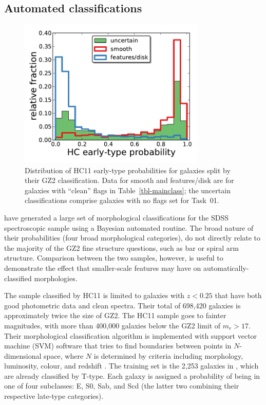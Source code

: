 \documentclass[useAMS,usenatbib]{mn2e}
\begin{document}
\subsection{Automated classifications}

\begin{figure}
\includegraphics[angle=0,width=3.5in]{figures/hc_histogram.pdf}
\caption{Distribution of HC11 early-type probabilities for galaxies split by their GZ2 classification. Data for smooth and features/disk are for galaxies with ``clean'' flags in Table~\ref{tbl-mainclass}; the uncertain classifications comprise galaxies with no flags set for Task~01. 
\label{fig-hc_histogram}}
\end{figure}

\citet[][HC11]{hue11} have generated a large set of morphological classifications for the SDSS spectroscopic sample using a Bayesian automated routine. The broad nature of their probabilities (four broad morphological categories), do not directly relate to the majority of the GZ2 fine structure questions, such as bar or spiral arm structure. Comparison between the two samples, however, is useful to demonstrate the effect that smaller-scale features may have on automatically-classified morphologies.

The sample classified by HC11 is limited to galaxies with $z<0.25$ that have both good photometric data and clean spectra. Their total of 698,420 galaxies is approximately twice the size of GZ2. The HC11 sample goes to fainter magnitudes, with more than 400,000 galaxies below the GZ2 limit of $m_r>17$. Their morphological classification algorithm is implemented with support vector machine (SVM) software that tries to find boundaries between points in $N$-dimensional space, where $N$ is determined by criteria including morphology, luminosity, colour, and redshift \citep{hue08}. The training set is the 2,253 galaxies in \citet{fuk07}, which are already classified by T-type. Each galaxy is assigned a probability of being in one of four subclasses: E, S0, Sab, and Scd (the latter two combining their respective late-type categories). 
\end{document}
